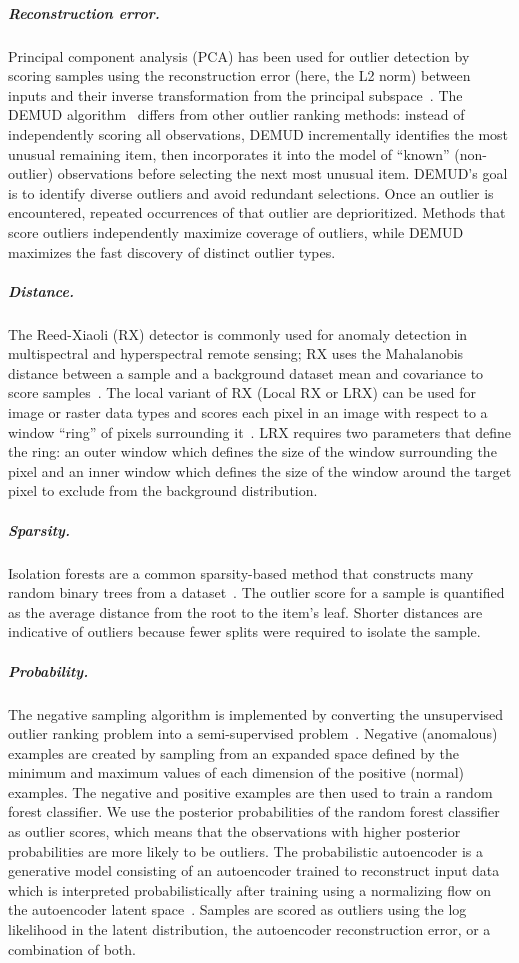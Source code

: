 \documentclass[letterpaper]{article} %
\begin{document}
\subparagraph{Reconstruction error.}
Principal component analysis (PCA) has been used for outlier detection by
scoring samples using the reconstruction error (here, the L2 norm)
between inputs and their inverse
 transformation from the principal subspace~\citep{kerner2020comparison}.
The DEMUD algorithm~\citep{wagstaff:demud13} differs from other
outlier ranking methods: instead of independently scoring all
observations, DEMUD incrementally identifies the most unusual
remaining item, then incorporates it into the model of ``known''
(non-outlier) observations before selecting the next most unusual
item.  DEMUD's goal is to identify diverse outliers and avoid
redundant selections.  Once an outlier is encountered, repeated
occurrences of that outlier are deprioritized.  Methods that score
outliers independently maximize coverage of outliers, while DEMUD
maximizes the fast discovery of distinct outlier types.

\subparagraph{Distance.}
 The 
Reed-Xiaoli (RX) detector is commonly used for anomaly detection in
multispectral and hyperspectral remote sensing; RX uses the Mahalanobis
 distance between a sample and a background dataset mean and covariance
 to score samples~\citep{reed1990adaptive}. The local variant of RX (Local
 RX or LRX) can be used for image or raster data types and scores each pixel in
  an image with respect to a window ``ring'' of pixels surrounding 
  it~\citep{molero2013analysis}. 
  LRX requires two parameters that define the ring: an outer window which 
  defines the size of the window surrounding the pixel and an inner window
   which defines the size of the window around the target pixel to exclude from
   the background distribution. 

\subparagraph{Sparsity.}
Isolation forests are a common sparsity-based method
that constructs many random binary trees from a 
dataset~\cite{liu2008isolation}. The outlier score for
a sample is quantified as the average distance from the root to the item’s 
leaf. Shorter distances are indicative of outliers because fewer splits were 
required to isolate the sample.

\subparagraph{Probability.}
The negative sampling algorithm is implemented by converting the unsupervised 
outlier ranking problem into a semi-supervised 
problem~\citep{sipple:neg-sampling20}. Negative (anomalous) 
examples are created by sampling from an expanded space defined by the minimum 
and maximum values of each dimension of the positive (normal) examples. The 
negative and positive examples are then used to train a random forest 
classifier. We use the posterior probabilities of the random forest classifier 
as outlier scores, which means that the observations with higher posterior 
probabilities are more likely to be outliers.
The probabilistic autoencoder is a generative model consisting of an
autoencoder trained to reconstruct input data which is interpreted
probabilistically after training using a normalizing flow on the autoencoder
latent space~\cite{bohm2020probabilistic}.
Samples are scored as outliers using the log likelihood in the latent
distribution, the autoencoder reconstruction error, or a combination of
both.
\end{document}
